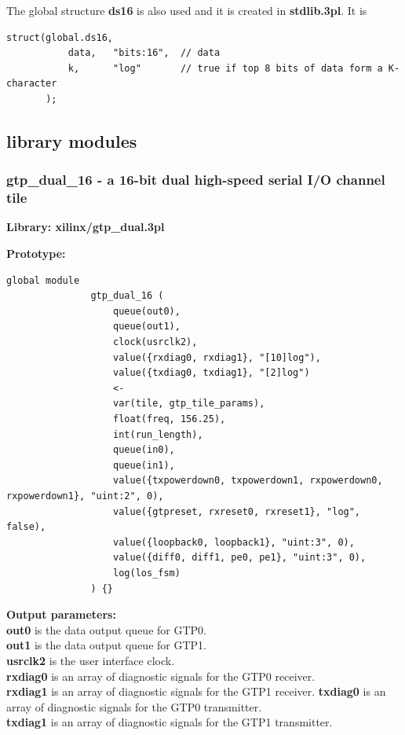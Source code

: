    The global structure {\bf ds16} is also used and it is created in
    {\bf stdlib.3pl}. It is 
    \begin{lstlisting}[gobble=4, language=threepl]
       struct(global.ds16,
           data,   "bits:16",  // data
           k,      "log"       // true if top 8 bits of data form a K-character
       );
    \end{lstlisting}


    \subsection{library modules}

        \subsubsection{gtp\_dual\_16 - a 16-bit dual high-speed serial I/O channel tile}\label{sec:lmgtpdual16}

            {\bf Library: xilinx/gtp\_dual.3pl}

            {\bf Prototype:} \\
            \vsp
            \begin{lstlisting}[gobble=12, language=threepl]
               global module
               gtp_dual_16 (
                   queue(out0),
                   queue(out1),
                   clock(usrclk2),
                   value({rxdiag0, rxdiag1}, "[10]log"),
                   value({txdiag0, txdiag1}, "[2]log")
                   <-
                   var(tile, gtp_tile_params),
                   float(freq, 156.25),
                   int(run_length),
                   queue(in0),
                   queue(in1),
                   value({txpowerdown0, txpowerdown1, rxpowerdown0, rxpowerdown1}, "uint:2", 0),
                   value({gtpreset, rxreset0, rxreset1}, "log", false),
                   value({loopback0, loopback1}, "uint:3", 0),
                   value({diff0, diff1, pe0, pe1}, "uint:3", 0),
                   log(los_fsm)
               ) {}
            \end{lstlisting}

            {\bf Output parameters:} \\
            {\bf out0} is the data output queue for GTP0.\\
            {\bf out1} is the data output queue for GTP1.\\
            {\bf usrclk2} is the user interface clock.\\
            {\bf rxdiag0} is an array of diagnostic signals for the GTP0 receiver.\\
            {\bf rxdiag1} is an array of diagnostic signals for the GTP1 receiver.
            {\bf txdiag0} is an array of diagnostic signals for the GTP0 transmitter.\\
            {\bf txdiag1} is an array of diagnostic signals for the GTP1 transmitter.
            
